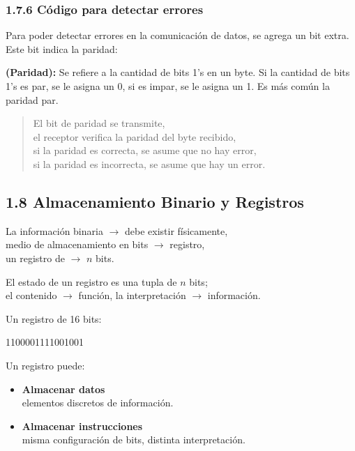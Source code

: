 \documentclass{article}
\begin{document}
\subsubsection*{1.7.6 C\'{o}digo para detectar errores}

Para poder detectar errores en la comunicaci\'{o}n de datos, se agrega un bit extra.
Este bit indica la paridad:

\textbf{(Paridad):} Se refiere a la cantidad de bits 1's en un byte. Si la cantidad de
bits 1's es par, se le asigna un 0, si es impar, se le asigna un 1. Es m\'{a}s com\'{u}n
la paridad par.

\begin{verse}
    El bit de paridad se transmite, \\
    el receptor verifica la paridad del byte recibido, \\
    si la paridad es correcta, se asume que no hay error, \\
    si la paridad es incorrecta, se asume que hay un error.
\end{verse}

\subsection*{1.8 Almacenamiento Binario y Registros}

La informaci\'{o}n binaria $\rightarrow$ debe existir f\'{i}sicamente, \\
medio de almacenamiento en bits $\rightarrow$ registro, \\
un registro de $\rightarrow$ $n$ bits.
\medbreak

El estado de un registro es una tupla de $n$ bits; \\
el contenido $\rightarrow$ funci\'{o}n, la interpretaci\'{o}n $\rightarrow$ informaci\'{o}n.
\medbreak

Un registro de 16 bits:
\begin{center}
    1100001111001001
\end{center} 

Un registro puede:
\begin{itemize}
    \item \begin{center}
        \textbf{Almacenar datos} \\
        elementos discretos de informaci\'{o}n.
    \end{center}
    \item \begin{center}
        \textbf{Almacenar instrucciones} \\
        misma configuraci\'{o}n de bits, distinta interpretaci\'{o}n.
    \end{center}
\end{itemize}
\medbreak
\end{document}
